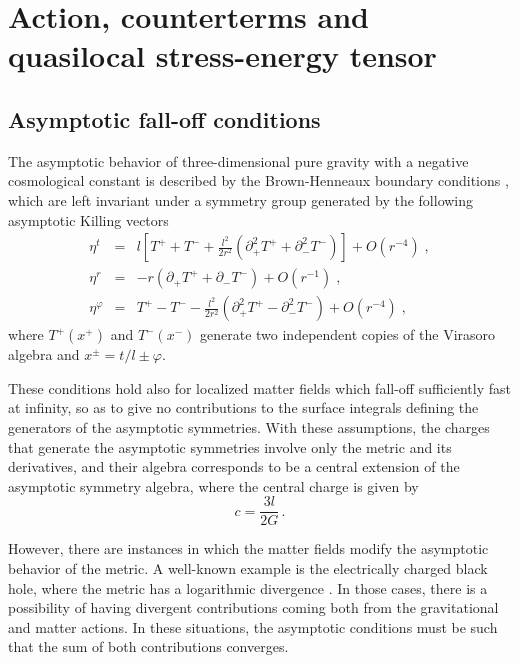 \documentclass[a4paper,12pt]{article}
\begin{document}
\section{Action, counterterms and quasilocal stress-energy tensor}

\subsection{Asymptotic fall-off conditions}

The asymptotic behavior of three-dimensional pure gravity with a negative
cosmological constant is described by the Brown-Henneaux boundary conditions 
\cite{Brown-Henneaux}, which are left invariant under a symmetry group
generated by the following asymptotic Killing vectors 
\begin{eqnarray}
\eta ^{t} &=&l\left[ T^{+}+T^{-}+\frac{l^{2}}{2r^{2}}(\partial
_{+}^{2}T^{+}+\partial _{-}^{2}T^{-})\right] +O(r^{-4})\;,  \nonumber \\
\eta ^{r} &=&-r(\partial _{+}T^{+}+\partial _{-}T^{-})+O(r^{-1})\;,
\label{AsymptKillingVectors} \\
\eta ^{\varphi } &=&T^{+}-T^{-}-\frac{l^{2}}{2r^{2}}(\partial
_{+}^{2}T^{+}-\partial _{-}^{2}T^{-})+O(r^{-4})\;,  \nonumber
\end{eqnarray}
where $T^{+}(x^{+})$ and $T^{-}(x^{-})$ generate two independent copies of
the Virasoro algebra and $x^{\pm }=t/l\pm \varphi $.

These conditions hold also for localized matter fields which fall-off
sufficiently fast at infinity, so as to give no contributions to the surface
integrals defining the generators of the asymptotic symmetries. With these
assumptions, the charges that generate the asymptotic symmetries involve
only the metric and its derivatives, and their algebra corresponds to be a
central extension of the asymptotic symmetry algebra, where the central
charge is given by 
\begin{equation}
c=\frac{3l}{2G}\,.  \label{Central Charge}
\end{equation}

However, there are instances in which the matter fields modify the
asymptotic behavior of the metric. A well-known example is the electrically
charged black hole, where the metric has a logarithmic divergence
 \cite{BTZ, MTZ, Ashtekar:2002qc}. 
In those cases, there is a possibility of having divergent
contributions coming both from the gravitational and matter actions. In
these situations, the asymptotic conditions must be such that the sum of
both contributions converges.
\end{document}

